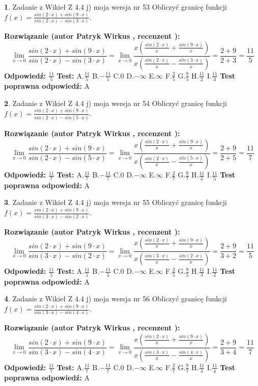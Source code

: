 \documentclass[12pt, a4paper]{article}
\theoremstyle{definition} %
\newtheorem{zad}{}
\newcommand{\zadStart}[1]{\begin{zad}#1\newline}
\newcommand{\zadStop}{\end{zad}}
\newcommand{\rozwStart}[2]{\noindent \textbf{Rozwiązanie (autor #1 , recenzent #2): }\newline}
\newcommand{\rozwStop}{\newline}
\newcommand{\odpStart}{\noindent \textbf{Odpowiedź:}\newline}
\newcommand{\odpStop}{\newline}
\newcommand{\testStart}{\noindent \textbf{Test:}\newline}
\newcommand{\testStop}{\newline}
\newcommand{\kluczStart}{\noindent \textbf{Test poprawna odpowiedź:}\newline}
\newcommand{\kluczStop}{\newline}
\begin{document}
\zadStart{Zadanie z Wikieł Z 4.4 j) moja wersja nr 53}
Obliczyć granicę funkcji $f(x)=\frac{sin(2\cdot x) +sin(9\cdot x)}{sin(2\cdot x) -sin(3\cdot x)}$.
\zadStop
\rozwStart{Patryk Wirkus}{}
$$\lim\limits_{x\to 0}\frac{sin(2\cdot x) +sin(9\cdot x)}{sin(2\cdot x) -sin(3\cdot x)}=\lim\limits_{x\to 0}\frac{x(\frac{sin(2\cdot x)}{x}+\frac{sin(9\cdot x)}{x})}{x(\frac{sin(2\cdot x)}{x}-\frac{sin(3\cdot x)}{x})}=\frac{2+9}{2+3} = \frac{11}{5}$$
\rozwStop
\odpStart
$\frac{11}{5}$
\odpStop
\testStart
A.$\frac{11}{5}$
B.$-\frac{11}{5}$
C.$0$
D.$-\infty$
E.$\infty$
F.$\frac{2}{5}$
G.$\frac{9}{5}$
H.$\frac{11}{2}$
I.$\frac{11}{3}$
\testStop
\kluczStart
A
\kluczStop



\zadStart{Zadanie z Wikieł Z 4.4 j) moja wersja nr 54}
Obliczyć granicę funkcji $f(x)=\frac{sin(2\cdot x) +sin(9\cdot x)}{sin(2\cdot x) -sin(5\cdot x)}$.
\zadStop
\rozwStart{Patryk Wirkus}{}
$$\lim\limits_{x\to 0}\frac{sin(2\cdot x) +sin(9\cdot x)}{sin(2\cdot x) -sin(5\cdot x)}=\lim\limits_{x\to 0}\frac{x(\frac{sin(2\cdot x)}{x}+\frac{sin(9\cdot x)}{x})}{x(\frac{sin(2\cdot x)}{x}-\frac{sin(5\cdot x)}{x})}=\frac{2+9}{2+5} = \frac{11}{7}$$
\rozwStop
\odpStart
$\frac{11}{7}$
\odpStop
\testStart
A.$\frac{11}{7}$
B.$-\frac{11}{7}$
C.$0$
D.$-\infty$
E.$\infty$
F.$\frac{2}{7}$
G.$\frac{9}{7}$
H.$\frac{11}{2}$
I.$\frac{11}{5}$
\testStop
\kluczStart
A
\kluczStop



\zadStart{Zadanie z Wikieł Z 4.4 j) moja wersja nr 55}
Obliczyć granicę funkcji $f(x)=\frac{sin(2\cdot x) +sin(9\cdot x)}{sin(3\cdot x) -sin(2\cdot x)}$.
\zadStop
\rozwStart{Patryk Wirkus}{}
$$\lim\limits_{x\to 0}\frac{sin(2\cdot x) +sin(9\cdot x)}{sin(3\cdot x) -sin(2\cdot x)}=\lim\limits_{x\to 0}\frac{x(\frac{sin(2\cdot x)}{x}+\frac{sin(9\cdot x)}{x})}{x(\frac{sin(3\cdot x)}{x}-\frac{sin(2\cdot x)}{x})}=\frac{2+9}{3+2} = \frac{11}{5}$$
\rozwStop
\odpStart
$\frac{11}{5}$
\odpStop
\testStart
A.$\frac{11}{5}$
B.$-\frac{11}{5}$
C.$0$
D.$-\infty$
E.$\infty$
F.$\frac{2}{5}$
G.$\frac{9}{5}$
H.$\frac{11}{3}$
I.$\frac{11}{2}$
\testStop
\kluczStart
A
\kluczStop



\zadStart{Zadanie z Wikieł Z 4.4 j) moja wersja nr 56}
Obliczyć granicę funkcji $f(x)=\frac{sin(2\cdot x) +sin(9\cdot x)}{sin(3\cdot x) -sin(4\cdot x)}$.
\zadStop
\rozwStart{Patryk Wirkus}{}
$$\lim\limits_{x\to 0}\frac{sin(2\cdot x) +sin(9\cdot x)}{sin(3\cdot x) -sin(4\cdot x)}=\lim\limits_{x\to 0}\frac{x(\frac{sin(2\cdot x)}{x}+\frac{sin(9\cdot x)}{x})}{x(\frac{sin(3\cdot x)}{x}-\frac{sin(4\cdot x)}{x})}=\frac{2+9}{3+4} = \frac{11}{7}$$
\rozwStop
\odpStart
$\frac{11}{7}$
\odpStop
\testStart
A.$\frac{11}{7}$
B.$-\frac{11}{7}$
C.$0$
D.$-\infty$
E.$\infty$
F.$\frac{2}{7}$
G.$\frac{9}{7}$
H.$\frac{11}{3}$
I.$\frac{11}{4}$
\testStop
\kluczStart
A
\kluczStop
\end{document}
